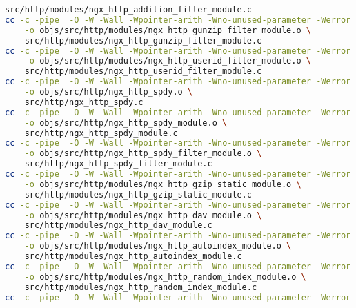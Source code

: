 \begin{lstlisting}[language=bash]
	src/http/modules/ngx_http_addition_filter_module.c
cc -c -pipe  -O -W -Wall -Wpointer-arith -Wno-unused-parameter -Werror -g  -I src/core -I src/event -I src/event/modules -I src/os/unix -I objs -I src/http -I src/http/modules \
	-o objs/src/http/modules/ngx_http_gunzip_filter_module.o \
	src/http/modules/ngx_http_gunzip_filter_module.c
cc -c -pipe  -O -W -Wall -Wpointer-arith -Wno-unused-parameter -Werror -g  -I src/core -I src/event -I src/event/modules -I src/os/unix -I objs -I src/http -I src/http/modules \
	-o objs/src/http/modules/ngx_http_userid_filter_module.o \
	src/http/modules/ngx_http_userid_filter_module.c
cc -c -pipe  -O -W -Wall -Wpointer-arith -Wno-unused-parameter -Werror -g  -I src/core -I src/event -I src/event/modules -I src/os/unix -I objs -I src/http -I src/http/modules \
	-o objs/src/http/ngx_http_spdy.o \
	src/http/ngx_http_spdy.c
cc -c -pipe  -O -W -Wall -Wpointer-arith -Wno-unused-parameter -Werror -g  -I src/core -I src/event -I src/event/modules -I src/os/unix -I objs -I src/http -I src/http/modules \
	-o objs/src/http/ngx_http_spdy_module.o \
	src/http/ngx_http_spdy_module.c
cc -c -pipe  -O -W -Wall -Wpointer-arith -Wno-unused-parameter -Werror -g  -I src/core -I src/event -I src/event/modules -I src/os/unix -I objs -I src/http -I src/http/modules \
	-o objs/src/http/ngx_http_spdy_filter_module.o \
	src/http/ngx_http_spdy_filter_module.c
cc -c -pipe  -O -W -Wall -Wpointer-arith -Wno-unused-parameter -Werror -g  -I src/core -I src/event -I src/event/modules -I src/os/unix -I objs -I src/http -I src/http/modules \
	-o objs/src/http/modules/ngx_http_gzip_static_module.o \
	src/http/modules/ngx_http_gzip_static_module.c
cc -c -pipe  -O -W -Wall -Wpointer-arith -Wno-unused-parameter -Werror -g  -I src/core -I src/event -I src/event/modules -I src/os/unix -I objs -I src/http -I src/http/modules \
	-o objs/src/http/modules/ngx_http_dav_module.o \
	src/http/modules/ngx_http_dav_module.c
cc -c -pipe  -O -W -Wall -Wpointer-arith -Wno-unused-parameter -Werror -g  -I src/core -I src/event -I src/event/modules -I src/os/unix -I objs -I src/http -I src/http/modules \
	-o objs/src/http/modules/ngx_http_autoindex_module.o \
	src/http/modules/ngx_http_autoindex_module.c
cc -c -pipe  -O -W -Wall -Wpointer-arith -Wno-unused-parameter -Werror -g  -I src/core -I src/event -I src/event/modules -I src/os/unix -I objs -I src/http -I src/http/modules \
	-o objs/src/http/modules/ngx_http_random_index_module.o \
	src/http/modules/ngx_http_random_index_module.c
cc -c -pipe  -O -W -Wall -Wpointer-arith -Wno-unused-parameter -Werror -g  -I src/core -I src/event -I src/event/modules -I src/os/unix -I objs -I src/http -I src/http/modules \

\end{lstlisting}
